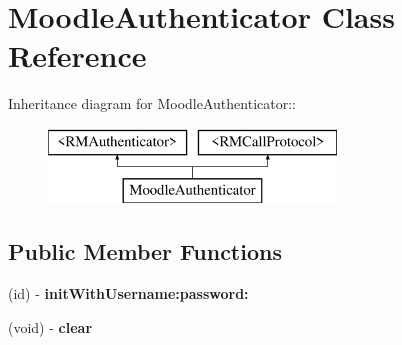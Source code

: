 \hypertarget{interface_moodle_authenticator}{
\section{MoodleAuthenticator Class Reference}
\label{interface_moodle_authenticator}
}
Inheritance diagram for MoodleAuthenticator::\begin{figure}[H]
\begin{center}
\leavevmode
\includegraphics[height=2cm]{interface_moodle_authenticator}
\end{center}
\end{figure}
\subsection*{Public Member Functions}
\begin{DoxyCompactItemize}
\item 
\hypertarget{interface_moodle_authenticator_ad3b73d398215060e69d3e2f2ce01cef5}{
(id) -\/ {\bfseries initWithUsername:password:}}
\label{interface_moodle_authenticator_ad3b73d398215060e69d3e2f2ce01cef5}

\item 
\hypertarget{interface_moodle_authenticator_af3f33c92fc0d146b8435e35a415cc8f7}{
(void) -\/ {\bfseries clear}}
\label{interface_moodle_authenticator_af3f33c92fc0d146b8435e35a415cc8f7}

\end{DoxyCompactItemize}

